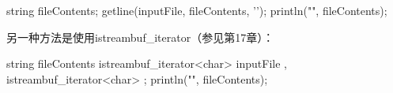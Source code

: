 \begin{cpp}
string fileContents;
getline(inputFile, fileContents, '\0');
println("{}", fileContents);
\end{cpp}

另一种方法是使用istreambuf\_iterator（参见第17章）：

\begin{cpp}
string fileContents {
    istreambuf_iterator<char> { inputFile },
    istreambuf_iterator<char> { }
};
println("{}", fileContents);
\end{cpp}













